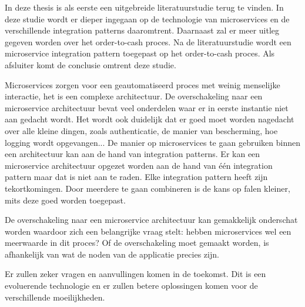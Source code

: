 In deze thesis is als eerste een uitgebreide literatuurstudie terug te vinden. In deze studie wordt er dieper ingegaan op de technologie van microservices en de verschillende integration patterns daaromtrent. Daarnaast zal er meer uitleg gegeven worden over het order-to-cash proces.
Na de literatuurstudie wordt een microservice integration pattern toegepast op het order-to-cash proces. Als afsluiter komt de conclusie omtrent deze studie.

Microservices zorgen voor een geautomatiseerd proces met weinig menselijke interactie, het is een complexe architectuur. De overschakeling naar een microservice architectuur bevat veel onderdelen waar er in eerste instantie niet aan gedacht wordt. Het wordt ook duidelijk dat er goed moet worden nagedacht over alle kleine dingen, zoals authenticatie, de manier van bescherming, hoe logging wordt opgevangen...
De manier op microservices te gaan gebruiken binnen een architectuur kan aan de hand van integration patterns. Er kan een microservice architectuur opgezet worden aan de hand van één integration pattern maar dat is niet aan te raden. Elke integration pattern heeft zijn tekortkomingen. Door meerdere te gaan combineren is de kans op falen kleiner, mits deze goed worden toegepast.

De overschakeling naar een microservice architectuur kan gemakkelijk onderschat worden waardoor zich een belangrijke vraag stelt: hebben microservices wel een meerwaarde in dit proces? Of de overschakeling moet gemaakt worden, is afhankelijk van wat de noden van de applicatie precies zijn.

Er zullen zeker vragen en aanvullingen komen in de toekomst. Dit is een evoluerende technologie en er zullen betere oplossingen komen voor de verschillende moeilijkheden.